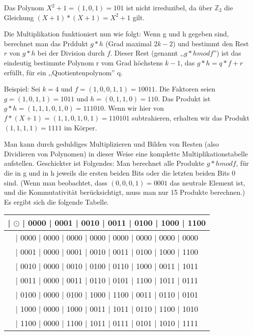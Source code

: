 \documentclass[a4paper]{article}
\begin{document}
\begin{multicols}{3}
    Das Polynom $X^2+1=(1,0,1)=101$ ist nicht irreduzibel, da über $\mathbb{Z}_2$ die Gleichung $(X+1)*(X+1)=X^2+1$ gilt.

    Die Multiplikation funktioniert nun wie folgt: Wenn g und h gegeben sind, berechnet man das Prddukt $g*h$ (Grad maximal $2k-2$) und bestimmt den Rest $r$ von $g*h$ bei der Division durch $f$. Dieser Rest (genannt ,,$g*h mod f$'') ist das eindeutig bestimmte Polynom r vom Grad höchstens $k-1$, das $g*h=q*f+r$ erfüllt, für ein ,,Quotientenpolynom'' q.

    Beispiel: Sei $k=4$ und $f=(1,0,0,1,1)=10011$. Die Faktoren seien $g=(1,0,1,1)=1011$ und $h=(0,1,1,0)=110$. Das Produkt ist $g*h=(1,1,1,0,1,0)=111010$. Wenn wir hier von $f*(X+1)=(1,1,0,1,0,1)=110101$ subtrahieren, erhalten wir das Produkt $(1,1,1,1)=1111$ im Körper.

    Man kann durch geduldiges Multiplizieren und Bilden von Resten (also Dividieren von Polynomen) in dieser Weise eine komplette Multiplikationstabelle aufstellen. Geschickter ist Folgendes: Man berechnet alle Produkte $g*h mod f$, für die in g und in h jeweils die ersten beiden Bits oder die letzten beiden Bits 0 sind. (Wenn man beobachtet, dass $(0,0,0,1)=0001$ das neutrale Element ist, und die Kommutativität berücksichtigt, muss man nur 15 Produkte berechnen.) Es ergibt sich die folgende Tabelle.

    \begin{tabular}{c}
        | $\odot$ | 0000 | 0001 | 0010 | 0011 | 0100 | 1000 | 1100 \\\hline
        | 0000  | 0000 | 0000 | 0000 | 0000 | 0000 | 0000 | 0000   \\
        | 0001  | 0000 | 0001 | 0010 | 0011 | 0100 | 1000 | 1100   \\
        | 0010  | 0000 | 0010 | 0100 | 0110 | 1000 | 0011 | 1011   \\
        | 0011  | 0000 | 0011 | 0110 | 0101 | 1100 | 1011 | 0111   \\
        | 0100  | 0000 | 0100 | 1000 | 1100 | 0011 | 0110 | 0101   \\
        | 1000  | 0000 | 1000 | 0011 | 1011 | 0110 | 1100 | 1010   \\
        | 1100  | 0000 | 1100 | 1011 | 0111 | 0101 | 1010 | 1111
    \end{tabular}


\end{multicols}
\end{document}
